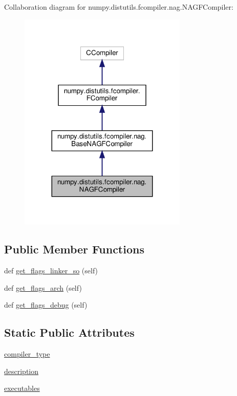 Collaboration diagram for numpy.\+distutils.\+fcompiler.\+nag.\+N\+A\+G\+F\+Compiler\+:
\nopagebreak
\begin{figure}[H]
\begin{center}
\leavevmode
\includegraphics[width=227pt]{classnumpy_1_1distutils_1_1fcompiler_1_1nag_1_1NAGFCompiler__coll__graph}
\end{center}
\end{figure}
\subsection*{Public Member Functions}
\begin{DoxyCompactItemize}
\item 
def \hyperlink{classnumpy_1_1distutils_1_1fcompiler_1_1nag_1_1NAGFCompiler_a93357d3be651532df095c9be436e2136}{get\+\_\+flags\+\_\+linker\+\_\+so} (self)
\item 
def \hyperlink{classnumpy_1_1distutils_1_1fcompiler_1_1nag_1_1NAGFCompiler_a7006f42f3672ee45ac7b98d84e4793d7}{get\+\_\+flags\+\_\+arch} (self)
\item 
def \hyperlink{classnumpy_1_1distutils_1_1fcompiler_1_1nag_1_1NAGFCompiler_a291dfda2a10362b2a63be98f553d9f2b}{get\+\_\+flags\+\_\+debug} (self)
\end{DoxyCompactItemize}
\subsection*{Static Public Attributes}
\begin{DoxyCompactItemize}
\item 
\hyperlink{classnumpy_1_1distutils_1_1fcompiler_1_1nag_1_1NAGFCompiler_ac60df5fa881d1e2621afe7545fc8c0a0}{compiler\+\_\+type}
\item 
\hyperlink{classnumpy_1_1distutils_1_1fcompiler_1_1nag_1_1NAGFCompiler_afdcde521662cbd339b8d81d89c33d7a3}{description}
\item 
\hyperlink{classnumpy_1_1distutils_1_1fcompiler_1_1nag_1_1NAGFCompiler_a97ff2a60e3d1e4cef0f97f663f313e44}{executables}
\end{DoxyCompactItemize}


